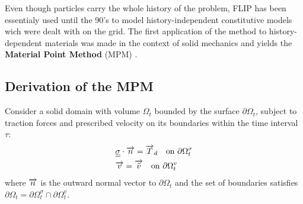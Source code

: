 Even though particles carry the whole history of the problem, FLIP has been essentialy used until the 90's to model history-independent constitutive models wich were dealt with on the grid. The first application of the method to history-dependent materials was made in the context of solid mechanics and yields the \textbf{Material Point Method} (MPM) \cite{Sulsky94}. %

\subsection{Derivation of the MPM}
Consider a solid domain with volume $\Omega_t$ bounded by the surface $\partial \Omega_t$, subject to traction forces and prescribed velocity on its boundaries within the time interval $\tau$:
\begin{align}
  & {\underline{\underline{\sigma}}}\cdot{\overrightarrow{n}}={\overrightarrow{T}}_d \quad \text{on } \partial \Omega_t^\sigma\\
  & {\overrightarrow{v}} = {\overrightarrow{\tilde{v}}} \quad \text{on } \partial \Omega_t^v
\end{align}
where ${\overrightarrow{n}}$ is the outward normal vector to $\partial \Omega_t$ and the set of boundaries satisfies $\partial \Omega_t =\partial \Omega^\sigma_t \cap \partial \Omega^v_t$.

